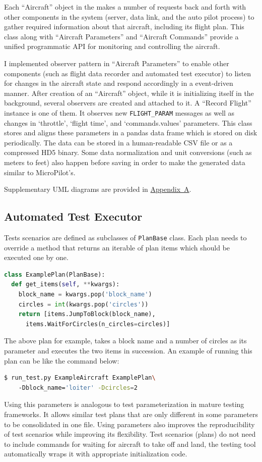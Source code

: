 Each ``Aircraft'' object in the makes a number of requests back and forth with other components in the system (server, data link, and the auto pilot process) to gather required information about that aircraft, including its flight plan. This class along with ``Aircraft Parameters'' and ``Aircraft Commands'' provide a unified programmatic API for monitoring and controlling the aircraft. 

I implemented observer pattern \cite{gamma1995design} in ``Aircraft Parameters'' to enable other components (such as flight data recorder and automated test executor) to listen for changes in the aircraft state and respond accordingly in a event-driven manner. 
After creation of an ``Aircraft'' object, while it is initializing itself in the background, several observers are created and attached to it. A ``Record Flight'' instance is one of them. It observes new \verb|FLIGHT_PARAM| messages as well as changes in `throttle', `flight time', and `commands.values' parameters. This class stores and aligns these parameters in a pandas data frame which is stored on disk periodically. The data can be stored in a human-readable CSV file or as a compressed HD5 binary. Some data normalization and unit conversions (such as meters to feet) also happen before saving in order to make the generated data similar to MicroPilot's.

Supplementary UML diagrams are provided in \hyperref[appendixa]{Appendix~A}.


\subsection{Automated Test Executor}
Tests scenarios are defined as subclasses of \verb|PlanBase| class. Each plan needs to override a method that returns an iterable of plan items which should be executed one by one. 
\begin{lstlisting}[language=Python, basicstyle=\linespread{0.1}]
class ExamplePlan(PlanBase):
  def get_items(self, **kwargs):
    block_name = kwargs.pop('block_name')
    circles = int(kwargs.pop('circles'))
    return [items.JumpToBlock(block_name),
      items.WaitForCircles(n_circles=circles)]
\end{lstlisting}
The above plan for example, takes a block name and a number of circles as its parameter and executes the two items in succession. An example of running this plan can be like the command below:
\begin{lstlisting}[language=bash]
$ run_test.py ExampleAircraft ExamplePlan\ 
    -Dblock_name='loiter' -Dcircles=2
\end{lstlisting}
Using this parameters is analogous to test parameterization in mature testing frameworks. It allows similar test plans that are only different in some parameters to be consolidated in one file. Using parameters also improves the reproducibility of test scenarios while improving its flexibility. Test scenarios (plans) do not need to include commands for waiting for aircraft to take off and land, the testing tool automatically wraps it with appropriate initialization code.


